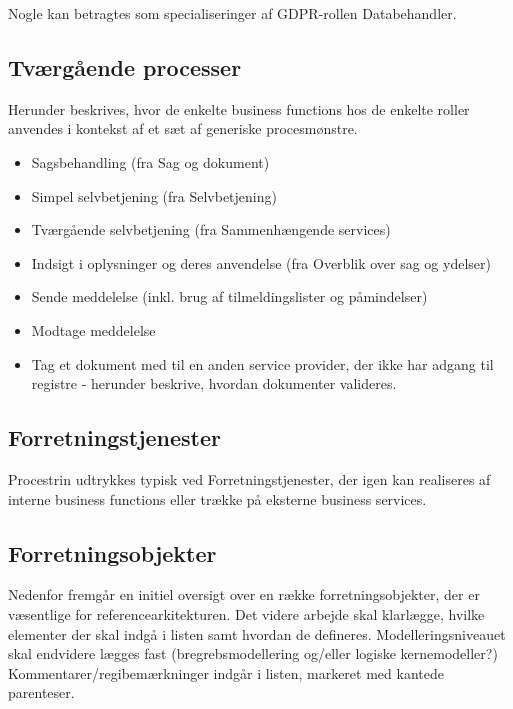 Nogle kan betragtes som specialiseringer af GDPR-rollen Databehandler.

\subsection{Tværgående processer}\label{tvuxe6rguxe5ende-processer}

Herunder beskrives, hvor de enkelte business functions hos de enkelte
roller anvendes i kontekst af et sæt af generiske procesmønstre.

\begin{itemize}
\tightlist
\item
  Sagsbehandling (fra Sag og dokument)
\item
  Simpel selvbetjening (fra Selvbetjening)
\item
  Tværgående selvbetjening (fra Sammenhængende services)
\item
  Indsigt i oplysninger og deres anvendelse (fra Overblik over sag og
  ydelser)
\item
  Sende meddelelse (inkl. brug af tilmeldingslister og påmindelser)
\item
  Modtage meddelelse
\item
  Tag et dokument med til en anden service provider, der ikke har adgang
  til registre - herunder beskrive, hvordan dokumenter valideres.
\end{itemize}

\subsection{Forretningstjenester}\label{forretningstjenester}

Procestrin udtrykkes typisk ved Forretningstjenester, der igen kan
realiseres af interne business functions eller trække på eksterne
business services.

\subsection{Forretningsobjekter}\label{forretningsobjekter}

Nedenfor fremgår en initiel oversigt over en række forretningsobjekter,
der er væsentlige for referencearkitekturen. Det videre arbejde skal
klarlægge, hvilke elementer der skal indgå i listen samt hvordan de
defineres. Modelleringsniveauet skal endvidere lægges fast
(bregrebsmodellering og/eller logiske kernemodeller?)
Kommentarer/regibemærkninger indgår i listen, markeret med kantede
parenteser.

